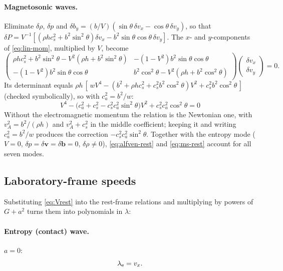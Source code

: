\documentclass[11pt,a4paper,oneside,openany]{book}
\theoremstyle{definition}
\theoremstyle{plain}
\theoremstyle{remark}
\newcommand{\vv}{\bm{v}}
\newcommand{\Ptot}{P}
\begin{document}
\paragraph{Magnetosonic waves.} Eliminate $\delta\rho$, $\delta p$ and $\delta b_y=
(b/V)(\sin\theta\,\delta v_x-\cos\theta\,\delta v_y)$, so that
$\delta\Ptot=V^{-1}[(\rho hc_s^2+b^2\sin^2\theta)\delta v_x-b^2\sin\theta\cos\theta\,\delta v_y]$.
The $x$- and $y$-components of \eqref{eq:lin-mom}, multiplied by $V$, become
\begin{equation}
\begin{pmatrix}
\rho hc_s^2+b^2\sin^2\theta-V^2(\rho h+b^2\sin^2\theta) & -(1-V^2)b^2\sin\theta\cos\theta\\
-(1-V^2)b^2\sin\theta\cos\theta & b^2\cos^2\theta-V^2(\rho h+b^2\cos^2\theta)
\end{pmatrix}
\begin{pmatrix}\delta v_x\\ \delta v_y\end{pmatrix}=0 .
\end{equation}
Its determinant equals $\rho h\,[\,wV^4-(b^2+\rho hc_s^2+c_s^2b^2\cos^2\theta)V^2+
c_s^2b^2\cos^2\theta\,]$ (checked symbolically), so with $c_a^2=b^2/w$:
\begin{equation}\label{eq:ms-rest}
\boxed{\;V^4-\bigl(c_a^2+c_s^2-c_s^2c_a^2\sin^2\theta\bigr)V^2+c_s^2c_a^2\cos^2\theta=0\;}
\end{equation}
Without the electromagnetic momentum the relation is the Newtonian one, with
$v_A^2=b^2/(\rho h)$ and $v_A^2+c_s^2$ in the middle coefficient; keeping it and writing
$c_a^2=b^2/w$ produces the correction $-c_s^2c_a^2\sin^2\theta$. Together
with the entropy mode ($V=0$, $\delta p=\delta\vv=\delta\bm b=0$, $\delta\rho\ne0$),
\eqref{eq:alfven-rest} and \eqref{eq:ms-rest} account for all seven modes.

\subsection{Laboratory-frame speeds}

Substituting \eqref{eq:Vrest} into the rest-frame relations and multiplying by powers of
$G+a^2$ turns them into polynomials in $\lambda$:

\paragraph{Entropy (contact) wave.} $a=0$:
\begin{equation}
\lambda_{\rm e}=v_x .
\end{equation}
\end{document}
